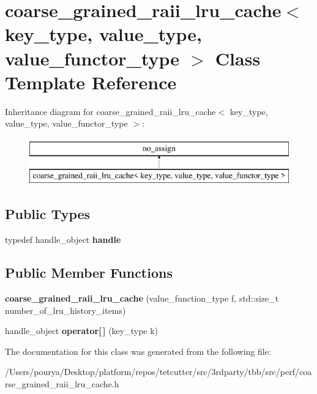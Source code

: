 \hypertarget{classcoarse__grained__raii__lru__cache}{}\section{coarse\+\_\+grained\+\_\+raii\+\_\+lru\+\_\+cache$<$ key\+\_\+type, value\+\_\+type, value\+\_\+functor\+\_\+type $>$ Class Template Reference}
\label{classcoarse__grained__raii__lru__cache}
Inheritance diagram for coarse\+\_\+grained\+\_\+raii\+\_\+lru\+\_\+cache$<$ key\+\_\+type, value\+\_\+type, value\+\_\+functor\+\_\+type $>$\+:\begin{figure}[H]
\begin{center}
\leavevmode
\includegraphics[height=2.000000cm]{classcoarse__grained__raii__lru__cache}
\end{center}
\end{figure}
\subsection*{Public Types}
\begin{DoxyCompactItemize}
\item 
\hypertarget{classcoarse__grained__raii__lru__cache_a8857f9fd8f7a3c6eda6547b8c4c82f8f}{}typedef handle\+\_\+object {\bfseries handle}\label{classcoarse__grained__raii__lru__cache_a8857f9fd8f7a3c6eda6547b8c4c82f8f}

\end{DoxyCompactItemize}
\subsection*{Public Member Functions}
\begin{DoxyCompactItemize}
\item 
\hypertarget{classcoarse__grained__raii__lru__cache_a106ffe58e945f936028f7d401607ff65}{}{\bfseries coarse\+\_\+grained\+\_\+raii\+\_\+lru\+\_\+cache} (value\+\_\+function\+\_\+type f, std\+::size\+\_\+t number\+\_\+of\+\_\+lru\+\_\+history\+\_\+items)\label{classcoarse__grained__raii__lru__cache_a106ffe58e945f936028f7d401607ff65}

\item 
\hypertarget{classcoarse__grained__raii__lru__cache_a5959ad0916ad2ce2014fa79bc3307ba5}{}handle\+\_\+object {\bfseries operator\mbox{[}$\,$\mbox{]}} (key\+\_\+type k)\label{classcoarse__grained__raii__lru__cache_a5959ad0916ad2ce2014fa79bc3307ba5}

\end{DoxyCompactItemize}


The documentation for this class was generated from the following file\+:\begin{DoxyCompactItemize}
\item 
/\+Users/pourya/\+Desktop/platform/repos/tetcutter/src/3rdparty/tbb/src/perf/coarse\+\_\+grained\+\_\+raii\+\_\+lru\+\_\+cache.\+h\end{DoxyCompactItemize}
